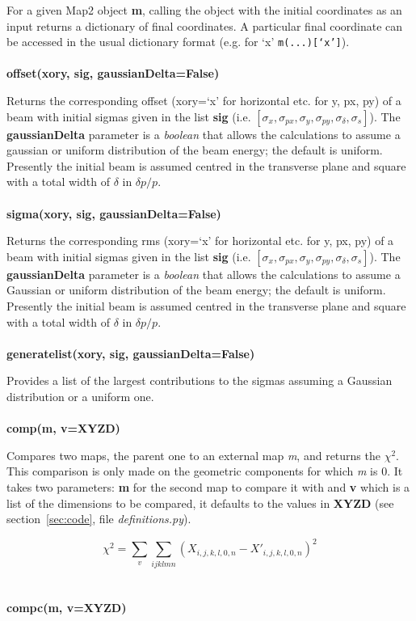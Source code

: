 \documentclass[a4paper]{cernatsnote}
\begin{document}
For a given Map2 object \textbf{m}, calling the object with the
initial coordinates as an input returns a dictionary of final
coordinates. A particular final coordinate can be accessed in the
usual dictionary format (e.g. for `x' \texttt{m(...)[`x']}).
\\\\
\textbf{offset(xory, sig, gaussianDelta=False)}

Returns the corresponding offset (xory=`x' for horizontal etc. for y,
px, py) of a beam with initial sigmas given in the list \textbf{sig}
(i.e. $[\sigma_x, \sigma_{px}, \sigma_y, \sigma_{py}, \sigma_\delta,
  \sigma_s]$). The \textbf{gaussianDelta} parameter is a
\textit{boolean} that allows the calculations to assume a gaussian or
uniform distribution of the beam energy; the default is uniform.
Presently the initial beam is assumed centred in the transverse plane
and square with a total width of $\delta$ in $\delta p/p$.
\\\\
\textbf{sigma(xory, sig, gaussianDelta=False)}

Returns the corresponding rms (xory=`x' for horizontal etc. for y,
px, py) of a beam with initial sigmas given in the list \textbf{sig}
(i.e. $[\sigma_x, \sigma_{px}, \sigma_y, \sigma_{py}, \sigma_\delta,
  \sigma_s]$). The \textbf{gaussianDelta} parameter is a
\textit{boolean} that allows the calculations to assume a Gaussian or
uniform distribution of the beam energy; the default is uniform.
Presently the initial beam is assumed centred in the transverse plane
and square with a total width of $\delta$ in $\delta p/p$.
\\\\
\textbf{generatelist(xory, sig, gaussianDelta=False)}

Provides a list of the largest contributions to the sigmas assuming a
Gaussian distribution or a uniform one.
\\\\
\textbf{comp(m, v=XYZD)}

Compares two maps, the parent one to an external map \textit{m},  
and returns the $\chi^2$. This comparison is only
made on the geometric components for which \textit{m} is 0. It takes two parameters:
\textbf{m} for the second map to compare it with and \textbf{v} which
is a list of the dimensions to be compared, it defaults to the values
in \textbf{XYZD} (see section~\ref{sec:code}, file
\textit{definitions.py}).

\[\chi^2 = \sum_{v} \sum_{ijklmn} \left(X_{i,j,k,l,0,n} - X'_{i,j,k,l,0,n} \right)^2\]
\\\\
\textbf{compc(m, v=XYZD)}
\end{document}
